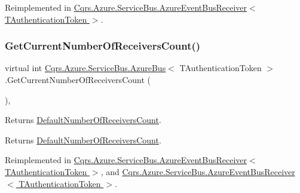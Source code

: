 Reimplemented in \hyperlink{classCqrs_1_1Azure_1_1ServiceBus_1_1AzureEventBusReceiver_a4c16501e26662fc8bc15613eeb3673d7_a4c16501e26662fc8bc15613eeb3673d7}{Cqrs.\+Azure.\+Service\+Bus.\+Azure\+Event\+Bus\+Receiver$<$ T\+Authentication\+Token $>$}.

\mbox{\label{classCqrs_1_1Azure_1_1ServiceBus_1_1AzureBus_a8489f49aa20b972411e12465baa1bd14_a8489f49aa20b972411e12465baa1bd14}} 
\subsubsection{\texorpdfstring{Get\+Current\+Number\+Of\+Receivers\+Count()}{GetCurrentNumberOfReceiversCount()}}
{\footnotesize\ttfamily virtual int \hyperlink{classCqrs_1_1Azure_1_1ServiceBus_1_1AzureBus}{Cqrs.\+Azure.\+Service\+Bus.\+Azure\+Bus}$<$ T\+Authentication\+Token $>$.Get\+Current\+Number\+Of\+Receivers\+Count (\begin{DoxyParamCaption}{ }\end{DoxyParamCaption})\hspace{0.3cm}{\ttfamily [protected]}, {\ttfamily [virtual]}}



Returns \hyperlink{classCqrs_1_1Azure_1_1ServiceBus_1_1AzureBus_a19642a14d6cf036cbbdb68b9ba7e635d_a19642a14d6cf036cbbdb68b9ba7e635d}{Default\+Number\+Of\+Receivers\+Count}. 

\begin{DoxyReturn}{Returns}
\hyperlink{classCqrs_1_1Azure_1_1ServiceBus_1_1AzureBus_a19642a14d6cf036cbbdb68b9ba7e635d_a19642a14d6cf036cbbdb68b9ba7e635d}{Default\+Number\+Of\+Receivers\+Count}.
\end{DoxyReturn}


Reimplemented in \hyperlink{classCqrs_1_1Azure_1_1ServiceBus_1_1AzureEventBusReceiver_a153e44d4d94a6d812e3990cc2a417eed_a153e44d4d94a6d812e3990cc2a417eed}{Cqrs.\+Azure.\+Service\+Bus.\+Azure\+Event\+Bus\+Receiver$<$ T\+Authentication\+Token $>$}, and \hyperlink{classCqrs_1_1Azure_1_1ServiceBus_1_1AzureEventBusReceiver_a153e44d4d94a6d812e3990cc2a417eed_a153e44d4d94a6d812e3990cc2a417eed}{Cqrs.\+Azure.\+Service\+Bus.\+Azure\+Event\+Bus\+Receiver$<$ T\+Authentication\+Token $>$}.

